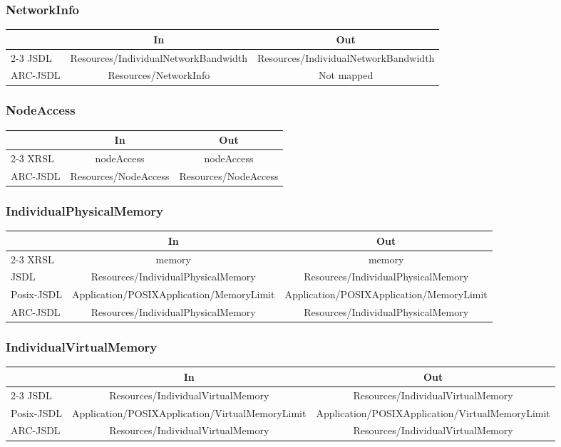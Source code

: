 \documentclass{article}
\newcommand{\NM}{\normalsize{\textnormal{Not mapped}}}
\newenvironment{inouttabular}%
{\begin{center}\begin{tabular}{l>{\ttfamily\footnotesize}c>{\ttfamily\footnotesize}c}%
\toprule
& \textnormal{\normalsize{In}} & \textnormal{\normalsize{Out}}\\ \cmidrule{2-3}}
{\bottomrule\end{tabular}\end{center}}
\begin{document}
\subsubsection{NetworkInfo}
\begin{inouttabular}
JSDL & Resources/IndividualNetworkBandwidth & Resources/IndividualNetworkBandwidth \\
ARC-JSDL & Resources/NetworkInfo & \NM\\
\end{inouttabular}

\subsubsection{NodeAccess}
\begin{inouttabular}
XRSL & nodeAccess & nodeAccess\\
ARC-JSDL & Resources/NodeAccess & Resources/NodeAccess\\
\end{inouttabular}

\subsubsection{IndividualPhysicalMemory}
\begin{inouttabular}
XRSL & memory & memory\\
JSDL & Resources/IndividualPhysicalMemory & Resources/IndividualPhysicalMemory\\
Posix-JSDL & Application/POSIXApplication/MemoryLimit & Application/POSIXApplication/MemoryLimit\\
ARC-JSDL & Resources/IndividualPhysicalMemory & Resources/IndividualPhysicalMemory\\
\end{inouttabular}

\subsubsection{IndividualVirtualMemory}
\begin{inouttabular}
JSDL & Resources/IndividualVirtualMemory & Resources/IndividualVirtualMemory\\
Posix-JSDL & Application/POSIXApplication/VirtualMemoryLimit & Application/POSIXApplication/VirtualMemoryLimit\\
ARC-JSDL & Resources/IndividualVirtualMemory & Resources/IndividualVirtualMemory\\
\end{inouttabular}
\end{document}
